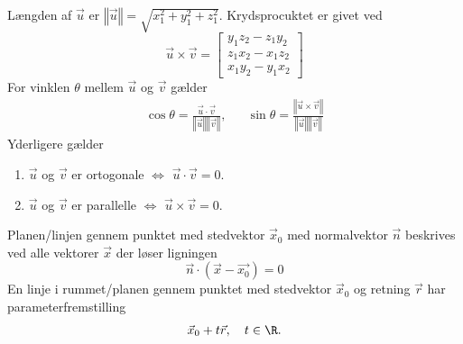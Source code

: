 Længden af $\vec{u}$ er $\left\Vert \vec{u}\right\Vert=\sqrt{x_1^2+y_1^2+z_1^2}$. Krydsprocuktet er givet ved 
\begin{equation*}
    \vec{u}\times \vec{v}=\begin{bmatrix}
        y_1z_2-z_1y_2\\ z_1x_2-x_1z_2\\x_1y_2-y_1x_2
    \end{bmatrix}
\end{equation*}
For vinklen $\theta$ mellem $\vec{u}$ og $\vec{v}$ gælder 
\begin{align*}
    \cos\theta=\frac{\vec{u}\cdot\vec{v}}{\left\Vert \vec{u}\right\Vert \left\Vert \vec{v}\right\Vert }, && \sin\theta=\frac{\left\Vert \vec{u}\times \vec{v}\right\Vert }{\left\Vert \vec{u}\right\Vert \left\Vert \vec{v}\right\Vert}
\end{align*}
Yderligere gælder 
\begin{enumerate}
    \item $\vec{u}$ og $\vec{v}$ er ortogonale $\Leftrightarrow$ $\vec{u}\cdot\vec{v}=0$.
    \item $\vec{u}$ og $\vec{v}$ er parallelle $\Leftrightarrow$ $\vec{u}\times\vec{v}=0$.
\end{enumerate}
Planen/linjen gennem punktet med stedvektor $\vec{x}_0$ med normalvektor $\vec{n}$ beskrives ved alle vektorer $\vec{x}$ der løser ligningen
\begin{equation*}
    \vec{n}\cdot(\vec{x}-\vec{x_0})=0
\end{equation*}
En linje i rummet/planen gennem punktet med stedvektor $\vec{x}_0$ og retning $\vec{r}$ har parameterfremstilling
\begin{align*}
    \vec{x}_0+t\vec{r}, \quad t\in \R.
\end{align*}